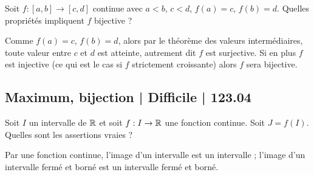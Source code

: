 \begin{question}

Soit $f : [a,b] \to [c,d]$ continue avec $a < b$, $c < d$, $f(a)=c$, $f(b)=d$. Quelles propriétés impliquent $f$ bijective ?
\begin{answers}



\end{answers}
\begin{explanations}
Comme $f(a)=c$, $f(b)=d$, alors par le théorème des valeurs intermédiaires, toute valeur entre $c$ et $d$ est atteinte, autrement dit $f$ est surjective. 
Si en plus $f$ est injective (ce qui est le cas si $f$ strictement croissante) alors $f$ sera bijective.
\end{explanations}
\end{question}




\subsection{Maximum, bijection | Difficile | 123.04}



\begin{question}

Soit $I$ un intervalle de $\mathbb{R}$ et soit $f : I \to \mathbb{R}$ une fonction continue. Soit $J=f(I)$. Quelles sont les assertions vraies ?
\begin{answers}



\end{answers}
\begin{explanations}
Par une fonction continue, l'image d'un intervalle est un intervalle ;
l'image d'un intervalle fermé et borné est un intervalle fermé et borné. 
\end{explanations}
\end{question}


